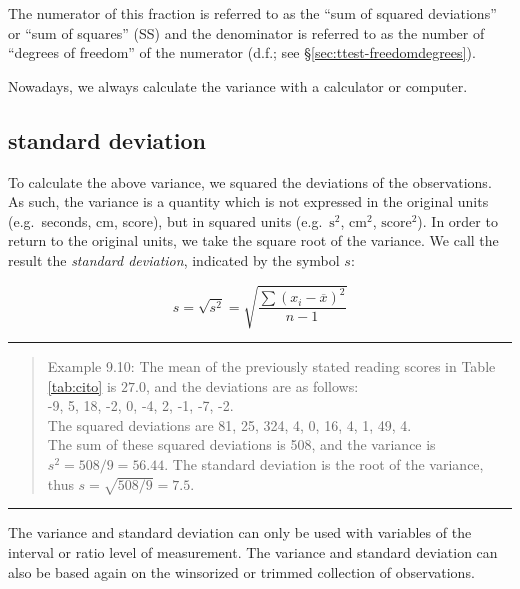 \documentclass[
]{book}
\begin{document}
The numerator of
this fraction is referred to as the ``sum of squared deviations'' or
``sum of squares'' (SS) and the denominator is referred to as the number of
``degrees of freedom'' of the numerator (d.f.; see
§\ref{sec:ttest-freedomdegrees}).

Nowadays, we always calculate the variance with a calculator
or computer.

\subsection{standard deviation}\label{sec:standarddeviation}

To calculate the above variance, we squared the deviations of the
observations. As such, the variance is a quantity which is not expressed
in the original units (e.g.~seconds, cm, score),
but in squared units (e.g.~\(\textrm{s}^2\),
\(\textrm{cm}^2\), \(\textrm{score}^2\)). In order to return to the
original units, we take the square root of the variance. We call the result the
\emph{standard deviation}, indicated by the symbol \(s\):

\begin{equation}
  s = \sqrt{s^2} = \sqrt{ \frac{ \sum (x_i - \overline{x})^2 } {n-1} }
  \label{eq:standarddeviation}
\end{equation}

\begin{center}\rule{0.5\linewidth}{0.5pt}\end{center}

\begin{quote}
Example 9.10:
The mean of the previously stated reading scores in
Table \ref{tab:cito} is
\(27.0\), and the deviations are as follows:\\
-9, 5, 18, -2, 0, -4, 2, -1, -7, -2.\\
The squared deviations are 81, 25, 324, 4, 0, 16, 4, 1, 49, 4.\\
The sum of these squared deviations is 508, and the variance is
\(s^2=508/9=56.44\). The standard deviation is the root of the
variance, thus \(s=\sqrt{508/9}=7.5\).
\end{quote}

\begin{center}\rule{0.5\linewidth}{0.5pt}\end{center}

The variance and standard deviation can only be used with variables
of the interval or ratio level of measurement. The variance and
standard deviation can also be based again on the winsorized or trimmed
collection of observations.
\end{document}
